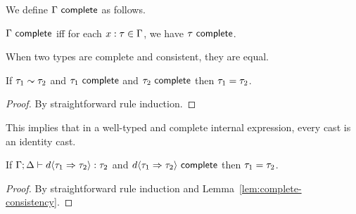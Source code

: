 We define $\Gamma~\mathsf{complete}$ as follows.
\begin{defn}
$\Gamma~\mathsf{complete}$ iff for each $x : \tau \in \Gamma$, we have $\tau~\mathsf{complete}$.
\end{defn}

When two types are complete and consistent, they are equal.

\begin{lem}\label{lem:complete-consistency} If $\tau_1 \sim \tau_2$ and $\tau_1~\mathsf{complete}$ and $\tau_2~\mathsf{complete}$ then $\tau_1 = \tau_2$.
\end{lem}
\begin{proof} By straightforward rule induction. \end{proof}

This implies that in a well-typed and complete internal expression, every cast is 
an identity cast.

\begin{lem} If $\Gamma; \Delta \vdash d \langle{\tau_1}\Rightarrow{\tau_2}\rangle : \tau_2$ and $d \langle{\tau_1}\Rightarrow{\tau_2}\rangle~\mathsf{complete}$ then $\tau_1 = \tau_2$. \end{lem}
\begin{proof} By straightforward rule induction and Lemma~\ref{lem:complete-consistency}. \end{proof}